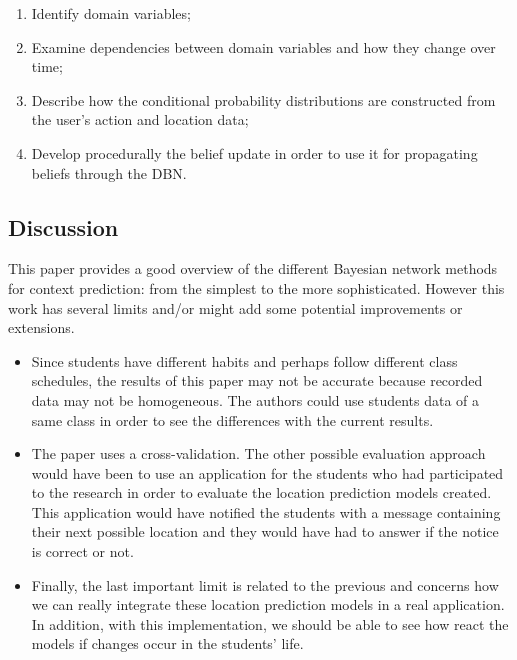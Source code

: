 \begin{enumerate}

\item Identify domain variables;
\item Examine dependencies between domain variables and how they change over time;
\item Describe how the conditional probability distributions are constructed from the user's action and location data;
\item Develop procedurally the belief update in order to use it for propagating beliefs through the DBN.

\end{enumerate}

\subsection{Discussion} \label{lect4-disc}

This paper provides a good overview of the different Bayesian network methods for context prediction: from the simplest to the more sophisticated. However this work has several limits and/or might add some potential improvements or extensions.

\begin{itemize}

\item Since students have different habits and perhaps follow different class schedules, the results of this paper may not be accurate because recorded data may not be homogeneous. The authors could use students data of a same class in order to see the differences with the current results.

\item The paper uses a cross-validation. The other possible evaluation approach would have been to use an application for the students who had participated to the research in order to evaluate the location prediction models created. This application would have notified the students with a message containing their next possible location and they would have had to answer if the notice is correct or not.

\item Finally, the last important limit is related to the previous and concerns how we can really integrate these location prediction models in a real application. In addition, with this implementation, we should be able to see how react the models if changes occur in the students' life.

\end{itemize}